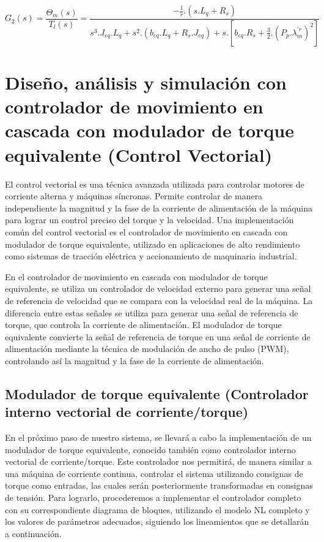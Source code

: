 \documentclass{article}
\begin{document}
\begin{equation}
    G_{2}(s) = \frac{\Theta_{m}(s)}{T_{l}(s)} = \frac{- \frac{1}{r}.(s.L_{q}+R_{s})}{s^3.J_{eq}.L_{q} + s^2.(b_{eq}.L_{q} +  R_{s}.J_{eq}) + s.[b_{eq}.R_{s}+\frac{3}{2}.(P_{p}.\lambda_{m}^{\prime r})^2]}
\end{equation}




\section*{Diseño, análisis y simulación con controlador de movimiento en cascada con modulador de torque equivalente (Control Vectorial)}

El control vectorial es una técnica avanzada utilizada para controlar motores de corriente alterna y máquinas 
síncronas. Permite controlar de manera independiente la magnitud y la fase de la corriente de alimentación de la 
máquina para lograr un control preciso del torque y la velocidad. Una implementación común del control vectorial 
es el controlador de movimiento en cascada con modulador de torque equivalente, utilizado en aplicaciones de alto 
rendimiento como sistemas de tracción eléctrica y accionamiento de maquinaria industrial.

En el controlador de movimiento en cascada con modulador de torque equivalente, se utiliza un controlador de 
velocidad externo para generar una señal de referencia de velocidad que se compara con la velocidad real de la 
máquina. La diferencia entre estas señales se utiliza para generar una señal de referencia de torque, que controla 
la corriente de alimentación. El modulador de torque equivalente convierte la señal de referencia de torque en una
señal de corriente de alimentación mediante la técnica de modulación de ancho de pulso (PWM), controlando así la 
magnitud y la fase de la corriente de alimentación.


\subsection*{Modulador de torque equivalente (Controlador interno vectorial de corriente/torque)}

En el próximo paso de nuestro sistema, se llevará a cabo la implementación de un modulador de torque equivalente, 
conocido también como controlador interno vectorial de corriente/torque. Este controlador nos permitirá, de manera
similar a una máquina de corriente continua, controlar el sistema utilizando consignas de torque como entradas, 
las cuales serán posteriormente transformadas en consignas de tensión. Para lograrlo, procederemos a implementar 
el controlador completo con su correspondiente diagrama de bloques, utilizando el modelo NL completo y los valores
de parámetros adecuados, siguiendo los lineamientos que se detallarán a continuación.
\end{document}
